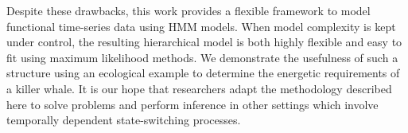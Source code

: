 


Despite these drawbacks, this work provides a flexible framework to model functional time-series data using HMM models. When model complexity is kept under control, the resulting hierarchical model is both highly flexible and easy to fit using maximum likelihood methods. We demonstrate the usefulness of such a structure using an ecological example to determine the energetic requirements of a killer whale. It is our hope that researchers adapt the methodology described here to solve problems and perform inference in other settings which involve temporally dependent state-switching processes.
